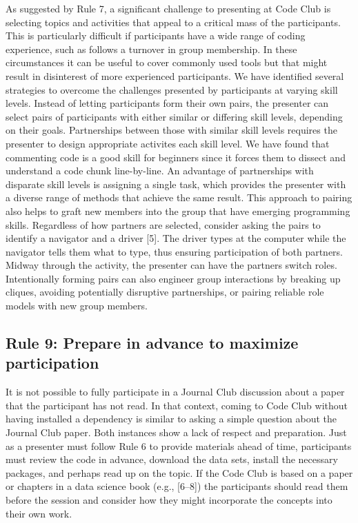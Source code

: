 \documentclass[11pt,]{article}
\begin{document}
As suggested by Rule 7, a significant challenge to presenting at Code
Club is selecting topics and activities that appeal to a critical mass
of the participants. This is particularly difficult if participants have
a wide range of coding experience, such as follows a turnover in group
membership. In these circumstances it can be useful to cover commonly
used tools but that might result in disinterest of more experienced
participants. We have identified several strategies to overcome the
challenges presented by participants at varying skill levels. Instead of
letting participants form their own pairs, the presenter can select
pairs of participants with either similar or differing skill levels,
depending on their goals. Partnerships between those with similar skill
levels requires the presenter to design appropriate activites each skill
level. We have found that commenting code is a good skill for beginners
since it forces them to dissect and understand a code chunk
line-by-line. An advantage of partnerships with disparate skill levels
is assigning a single task, which provides the presenter with a diverse
range of methods that achieve the same result. This approach to pairing
also helps to graft new members into the group that have emerging
programming skills. Regardless of how partners are selected, consider
asking the pairs to identify a navigator and a driver {[}5{]}. The
driver types at the computer while the navigator tells them what to
type, thus ensuring participation of both partners. Midway through the
activity, the presenter can have the partners switch roles.
Intentionally forming pairs can also engineer group interactions by
breaking up cliques, avoiding potentially disruptive partnerships, or
pairing reliable role models with new group members.

\subsection{Rule 9: Prepare in advance to maximize
participation}\label{rule-9-prepare-in-advance-to-maximize-participation}

It is not possible to fully participate in a Journal Club discussion
about a paper that the participant has not read. In that context, coming
to Code Club without having installed a dependency is similar to asking
a simple question about the Journal Club paper. Both instances show a
lack of respect and preparation. Just as a presenter must follow Rule 6
to provide materials ahead of time, participants must review the code in
advance, download the data sets, install the necessary packages, and
perhaps read up on the topic. If the Code Club is based on a paper or
chapters in a data science book (e.g., {[}6--8{]}) the participants
should read them before the session and consider how they might
incorporate the concepts into their own work.
\end{document}
